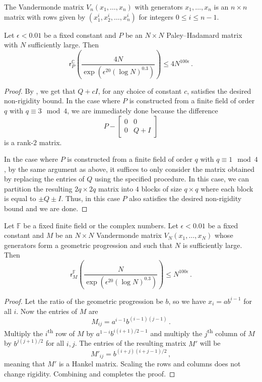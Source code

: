 \documentclass{toc}
\newcommand\F{{\mathbb{F}}}
\renewcommand\C{{\mathbb{C}}}
\newcommand{\ts}{\textsuperscript}
\begin{document}
{\begin{definition}
The Vandermonde matrix $V_n(x_1, \dots , x_n)$ with generators $x_1, \dots , x_n$ is an $n \times n$ matrix with rows given by $(x_1^i, x_2^i, \dots , x_n^i)$ for integers $0 \leq i \leq n-1$.
\end{definition}


\begin{corollary}  \label{cor:kivva1}
Let $\epsilon < 0.01$ be a fixed constant and $P$ be an $N \times N$ Paley--Hadamard matrix with $N$ sufficiently large.  Then
\[
\textsf{r}_P^{\C}\left( \frac{4N}{\exp\left(\epsilon^{20}(\log N)^{0.3}\right)}\right) \leq 4N^{100 \epsilon} \,.
\]
\end{corollary}
\begin{proof}
By , we get that $Q + cI$, for any choice of constant $c$, satisfies the desired non-rigidity bound.  In the case where $P$ is constructed from a finite field of order $q$ with $q \equiv 3 \mod 4$, we are immediately done because the difference
\[
P - \begin{bmatrix}0 & 0 \\ 0 & Q + I \end{bmatrix}
\]
is a rank-$2$ matrix.  %

In the case where $P$ is constructed from a finite field of order $q$ with $q \equiv 1 \mod 4$, by the same argument as above, it suffices to only consider the matrix obtained by replacing the entries of $Q$ using the specified procedure.  In this case, we can partition the resulting $2q \times 2q$ matrix into $4$ blocks of size $q \times q$ where each block is equal to $\pm Q \pm I$.  Thus, in this case $P$ also satisfies the desired non-rigidity bound and we are done.
\end{proof}

\begin{corollary}    \label{cor:kivva2}
Let $\F$ be a fixed finite field or the complex numbers.  Let $\epsilon < 0.01$ be a fixed constant and $M$ be an $N \times N$ Vandermonde matrix $V_N(x_1, \dots, x_N)$ whose generators form a geometric progression and such that $N$ is sufficiently large.  Then
\[
\textsf{r}_M^{\F}\left( \frac{N}{\exp\left(\epsilon^{20}(\log N)^{0.3}\right)}\right) \leq N^{100 \epsilon} \,.
\]
\end{corollary}
\begin{proof}
Let the ratio of the geometric progression be $b$,
%
%
so we have   %
$x_i = ab^{i-1}$ for all $i$.  Now the entries of $M$ are
\[
M_{ij} = a^{i-1}b^{(i-1)(j-1)} \,.
\]  
Multiply  
the $i$\ts{th} row of $M$ by $a^{1 - i}b^{i(i+1)/2 - 1}$ and
%
multiply   %
the $j$\ts{th} column of $M$ by $b^{j(j+1)/2}$ for all $i,j$.
The entries of the resulting matrix $M'$ will be
\[
M'_{ij} = b^{(i+j)(i+j-1)/2} \,,
\]
meaning that $M'$ is a Hankel matrix.
Scaling the rows and columns does not change rigidity.  %
Combining  and 
 completes the proof.
\end{proof}
%
}  %
\end{document}
